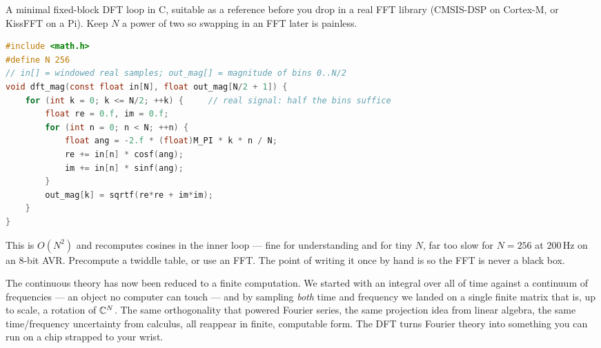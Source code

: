 \begin{buildbox}
A minimal fixed-block DFT loop in C, suitable as a reference before you drop in a
real FFT library (CMSIS-DSP on Cortex-M, or KissFFT on a Pi). Keep $N$ a power of
two so swapping in an FFT later is painless.
\begin{lstlisting}[language=C]
#include <math.h>
#define N 256
// in[] = windowed real samples; out_mag[] = magnitude of bins 0..N/2
void dft_mag(const float in[N], float out_mag[N/2 + 1]) {
    for (int k = 0; k <= N/2; ++k) {     // real signal: half the bins suffice
        float re = 0.f, im = 0.f;
        for (int n = 0; n < N; ++n) {
            float ang = -2.f * (float)M_PI * k * n / N;
            re += in[n] * cosf(ang);
            im += in[n] * sinf(ang);
        }
        out_mag[k] = sqrtf(re*re + im*im);
    }
}
\end{lstlisting}
This is $O(N^2)$ and recomputes cosines in the inner loop --- fine for
understanding and for tiny $N$, far too slow for $N=256$ at $200$\,Hz on an 8-bit
AVR. Precompute a twiddle table, or use an FFT. The point of writing it once
by hand is so the FFT is never a black box.
\end{buildbox}

\begin{aestheticbox}
The continuous theory has now been reduced to a finite computation. We started with an integral over all of
time against a continuum of frequencies --- an object no computer can touch --- and
by sampling \emph{both} time and frequency we landed on a single finite matrix
that is, up to scale, a rotation of $\mathbb{C}^N$. The same orthogonality that powered
Fourier series, the same projection idea from linear algebra, the same
time/frequency uncertainty from calculus, all reappear in finite, computable form.
The DFT turns Fourier theory into something you can run on a chip
strapped to your wrist.
\end{aestheticbox}

